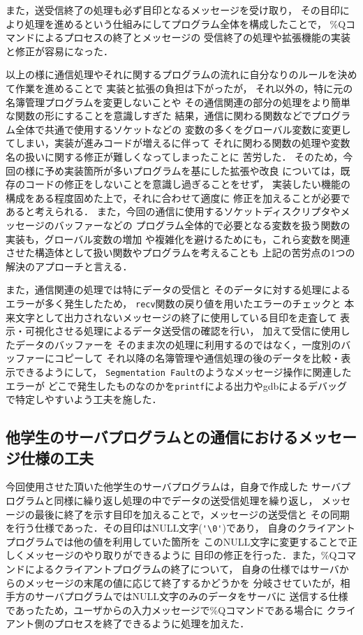 また，送受信終了の処理も必ず目印となるメッセージを受け取り，
その目印により処理を進めるという仕組みにしてプログラム全体を構成したことで，
\%Qコマンドによるプロセスの終了とメッセージの
受信終了の処理や拡張機能の実装と修正が容易になった．

以上の様に通信処理やそれに関するプログラムの流れに自分なりのルールを決めて作業を進めることで
実装と拡張の負担は下がったが，
それ以外の，特に元の名簿管理プログラムを変更しないことや
その通信関連の部分の処理をより簡単な関数の形にすることを意識しすぎた
結果，通信に関わる関数などでプログラム全体で共通で使用するソケットなどの
変数の多くをグローバル変数に変更してしまい，実装が進みコードが増えるに伴って
それに関わる関数の処理や変数名の扱いに関する修正が難しくなってしまったことに
苦労した．
そのため，今回の様に予め実装箇所が多いプログラムを基にした拡張や改良
については，既存のコードの修正をしないことを意識し過ぎることをせず，
実装したい機能の構成をある程度固めた上で，それに合わせて適度に
修正を加えることが必要であると考えられる．
また，今回の通信に使用するソケットディスクリプタやメッセージのバッファーなどの
プログラム全体的で必要となる変数を扱う関数の実装も，グローバル変数の増加
や複雑化を避けるためにも，これら変数を関連させた構造体として扱い関数やプログラムを考えることも
上記の苦労点の1つの解決のアプローチと言える．

また，通信関連の処理では特にデータの受信と
そのデータに対する処理によるエラーが多く発生したため，
\verb|recv|関数の戻り値を用いたエラーのチェックと
本来文字として出力されないメッセージの終了に使用している目印を走査して
表示・可視化させる処理によるデータ送受信の確認を行い，
加えて受信に使用したデータのバッファーを
そのまま次の処理に利用するのではなく，一度別のバッファーにコピーして
それ以降の名簿管理や通信処理の後のデータを比較・表示できるようにして，
\verb|Segmentation Fault|のようなメッセージ操作に関連したエラーが
どこで発生したものなのかを\verb|printf|による出力やgdbによるデバッグ
で特定しやすいよう工夫を施した．

\subsection{他学生のサーバプログラムとの通信におけるメッセージ仕様の工夫}
今回使用させた頂いた他学生のサーバプログラムは，自身で作成した
サーバプログラムと同様に繰り返し処理の中でデータの送受信処理を繰り返し，
メッセージの最後に終了を示す目印を加えることで，メッセージの送受信と
その同期を行う仕様であった．その目印はNULL文字(\verb|'\0'|)であり，
自身のクライアントプログラムでは他の値を利用していた箇所を
このNULL文字に変更することで正しくメッセージのやり取りができるように
目印の修正を行った．また，\%Qコマンドによるクライアントプログラムの終了について，
自身の仕様ではサーバからのメッセージの末尾の値に応じて終了するかどうかを
分岐させていたが，相手方のサーバプログラムではNULL文字のみのデータをサーバに
送信する仕様であったため，ユーザからの入力メッセージで\%Qコマンドである場合に
クライアント側のプロセスを終了できるように処理を加えた．

